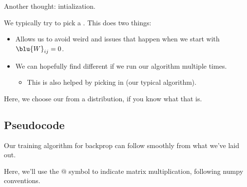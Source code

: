         Another thought: intialization.\\
        
        \begin{concept}
            We typically try to pick a . This does two things:
            
            \begin{itemize}
                \item Allows us to avoid weird  and  issues that happen when we start with $\blu{W}_{ij}=0$.
                
                \item We can hopefully find different  if we run our algorithm multiple times.
                    \begin{itemize}
                        \item This is also helped by picking  in  (our typical algorithm).
                    \end{itemize}
            \end{itemize}
            
            Here, we choose our  from a  distribution, if you know what that is.
        \end{concept}
        

        
    
    \subsection{Pseudocode}
    
        Our training algorithm for backprop can follow smoothly from what we've laid out.

        Here, we'll use the $@$ symbol to indicate matrix multiplication, following numpy conventions.
     
